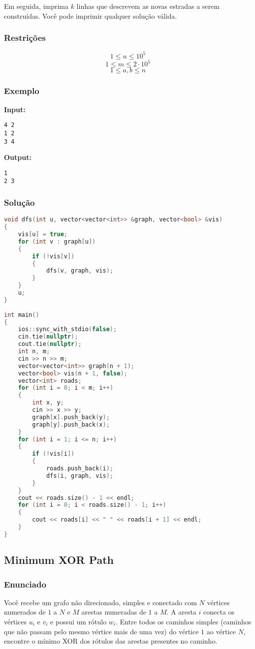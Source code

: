 Em seguida, imprima \( k \) linhas que descrevem as novas estradas a serem construídas. Você pode imprimir qualquer solução válida.

\subsubsection*{Restrições}
\[
1 \le n \le 10^5
\]
\[
1 \le m \le 2 \cdot 10^5
\]
\[
1 \le a,b \le n
\]

\subsubsection*{Exemplo}
\textbf{Input:}
\begin{verbatim}
4 2
1 2
3 4
\end{verbatim}

\textbf{Output:}
\begin{verbatim}
1
2 3
\end{verbatim}

\subsubsection*{Solução}
\begin{lstlisting}[language=C++]
void dfs(int u, vector<vector<int>> &graph, vector<bool> &vis)
{
    vis[u] = true;
    for (int v : graph[u])
    {
        if (!vis[v])
        {
            dfs(v, graph, vis);
        }
    }
    u;
}
 
int main()
{
    ios::sync_with_stdio(false);
    cin.tie(nullptr);
    cout.tie(nullptr);
    int n, m;
    cin >> n >> m;
    vector<vector<int>> graph(n + 1);
    vector<bool> vis(n + 1, false);
    vector<int> roads;
    for (int i = 0; i < m; i++)
    {
        int x, y;
        cin >> x >> y;
        graph[x].push_back(y);
        graph[y].push_back(x);
    }
    for (int i = 1; i <= n; i++)
    {
        if (!vis[i])
        {
            roads.push_back(i);
            dfs(i, graph, vis);
        }
    }
    cout << roads.size() - 1 << endl;
    for (int i = 0; i < roads.size() - 1; i++)
    {
        cout << roads[i] << " " << roads[i + 1] << endl;
    }
}    
\end{lstlisting}

\subsection{Minimum XOR Path}

\subsubsection*{Enunciado}
Você recebe um grafo não direcionado, simples e conectado com \(N\) vértices numerados de \(1\) a \(N\) e \(M\) arestas numeradas de \(1\) a \(M\). A aresta \(i\) conecta os vértices \(u_i\) e \(v_i\) e possui um rótulo \(w_i\). Entre todos os caminhos simples (caminhos que não passam pelo mesmo vértice mais de uma vez) do vértice \(1\) ao vértice \(N\), encontre o mínimo XOR dos rótulos das arestas presentes no caminho.

